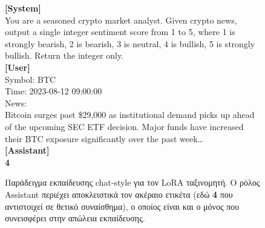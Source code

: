 \begin{figure}[htbp]
\centering
\colorbox{Mygray}{%
  \begin{minipage}{0.90\textwidth}
    \vspace{4pt}
    \small\sffamily\raggedright
    \textbf{[System]}\\[2pt]
    You are a seasoned crypto market analyst. Given crypto news, output a single integer
    sentiment score from 1 to 5, where 1 is strongly bearish, 2 is bearish, 3 is neutral,
    4 is bullish, 5 is strongly bullish. Return the integer only.\\[4pt]
    \textbf{[User]}\\[2pt]
    Symbol: BTC\\
    Time: 2023-08-12 09:00:00\\[2pt]
    News:\\
    Bitcoin surges past \$29{,}000 as institutional demand picks up ahead of the upcoming
    SEC ETF decision. Major funds have increased their BTC exposure significantly over
    the past week\ldots\\[4pt]
    \textbf{[Assistant]}\\[2pt]
    \textcolor{MyRed}{\textbf{4}}
    \vspace{4pt}
  \end{minipage}%
}
\caption[Παράδειγμα εκπαίδευσης chat-style για τον LoRA ταξινομητή]{Παράδειγμα
  εκπαίδευσης chat-style για τον LoRA ταξινομητή. Ο ρόλος Assistant περιέχει
  αποκλειστικά τον ακέραιο ετικέτα (εδώ \textcolor{MyRed}{\textbf{4}} που αντιστοιχεί
  σε θετικό συναίσθημα), ο οποίος είναι και ο μόνος που συνεισφέρει στην απώλεια
  εκπαίδευσης.}
\label{fig:lora-prompt}
\end{figure}

